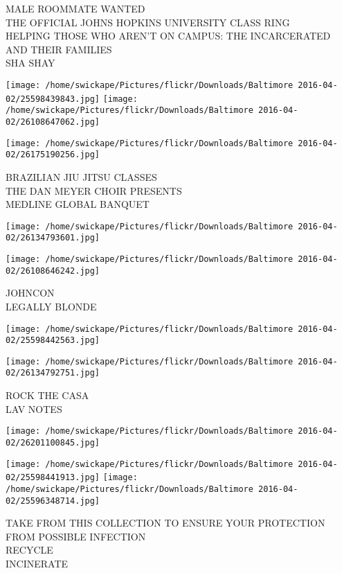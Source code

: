 \documentclass[10pt,letterpaper]{article}
\begin{document}
MALE ROOMMATE WANTED\\
THE OFFICIAL JOHNS HOPKINS UNIVERSITY CLASS RING\\
HELPING THOSE WHO AREN'T ON CAMPUS: THE INCARCERATED AND THEIR FAMILIES\\
SHA SHAY
\pagebreak

\texttt{[image: /home/swickape/Pictures/flickr/Downloads/Baltimore 2016-04-02/25598439843.jpg]}
\texttt{[image: /home/swickape/Pictures/flickr/Downloads/Baltimore 2016-04-02/26108647062.jpg]}

\vspace{0.25in}
\texttt{[image: /home/swickape/Pictures/flickr/Downloads/Baltimore 2016-04-02/26175190256.jpg]}

BRAZILIAN JIU JITSU CLASSES\\
THE DAN MEYER CHOIR PRESENTS\\
MEDLINE GLOBAL BANQUET
\pagebreak

\texttt{[image: /home/swickape/Pictures/flickr/Downloads/Baltimore 2016-04-02/26134793601.jpg]}

\vspace{0.25in}
\texttt{[image: /home/swickape/Pictures/flickr/Downloads/Baltimore 2016-04-02/26108646242.jpg]}

JOHNCON\\
LEGALLY BLONDE
\pagebreak

\texttt{[image: /home/swickape/Pictures/flickr/Downloads/Baltimore 2016-04-02/25598442563.jpg]}

\vspace{0.25in}
\texttt{[image: /home/swickape/Pictures/flickr/Downloads/Baltimore 2016-04-02/26134792751.jpg]}

ROCK THE CASA\\
LAV NOTES
\pagebreak

\texttt{[image: /home/swickape/Pictures/flickr/Downloads/Baltimore 2016-04-02/26201100845.jpg]}

\vspace{0.25in}
\texttt{[image: /home/swickape/Pictures/flickr/Downloads/Baltimore 2016-04-02/25598441913.jpg]}
\texttt{[image: /home/swickape/Pictures/flickr/Downloads/Baltimore 2016-04-02/25596348714.jpg]}

TAKE FROM THIS COLLECTION TO ENSURE YOUR PROTECTION FROM POSSIBLE INFECTION\\
RECYCLE\\
INCINERATE
\pagebreak
\end{document}
